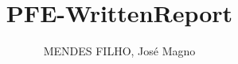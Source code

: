 \title{PFE-WrittenReport}
\author{MENDES FILHO, José Magno}

\newcommand{\N}{\mathbb{N}}
\newcommand{\R}{\mathbb{R}}
\newcommand{\Z}{\mathbb{Z}}


\newenvironment{abstractpage}
  {\cleardoublepage\vspace*{\fill}\thispagestyle{empty}}
  {\vfill\cleardoublepage}
\newenvironment{Abstract}[1]
  {\bigskip\selectlanguage{#1}%
   \begin{center}\bfseries\abstractname\end{center}}
  {\par\bigskip}

%




